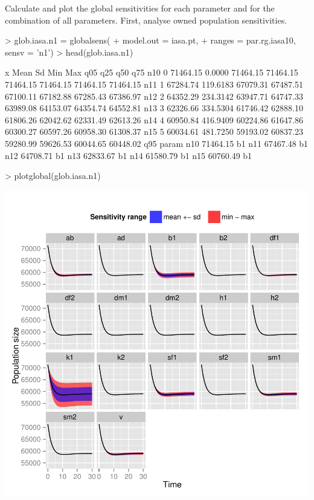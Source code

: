 \documentclass[a4paper]{article}
\begin{document}
Calculate and plot the global sensitivities for each parameter and for the combination of all parameters. First, analyse owned population sensitivities.
\begin{Schunk}
\begin{Sinput}
> glob.iasa.n1 = globalsens(
+   model.out = iasa.pt,
+   ranges = par.rg.iasa10, sensv = 'n1')
> head(glob.iasa.n1)
\end{Sinput}
\begin{Soutput}
    x     Mean       Sd      Min      Max      q05      q25      q50      q75
n10 0 71464.15   0.0000 71464.15 71464.15 71464.15 71464.15 71464.15 71464.15
n11 1 67284.74 119.6183 67079.31 67487.51 67100.11 67182.88 67285.43 67386.97
n12 2 64352.29 234.3142 63947.71 64747.33 63989.08 64153.07 64354.74 64552.81
n13 3 62326.66 334.5304 61746.42 62888.10 61806.26 62042.62 62331.49 62613.26
n14 4 60950.84 416.9409 60224.86 61647.86 60300.27 60597.26 60958.30 61308.37
n15 5 60034.61 481.7250 59193.02 60837.23 59280.99 59626.53 60044.65 60448.02
         q95 param
n10 71464.15    b1
n11 67467.48    b1
n12 64708.71    b1
n13 62833.67    b1
n14 61580.79    b1
n15 60760.49    b1
\end{Soutput}
\begin{Sinput}
> plotglobal(glob.iasa.n1)
\end{Sinput}
\end{Schunk}
\begin{center}
\includegraphics{capm_example-033}
\end{center}
\end{document}
